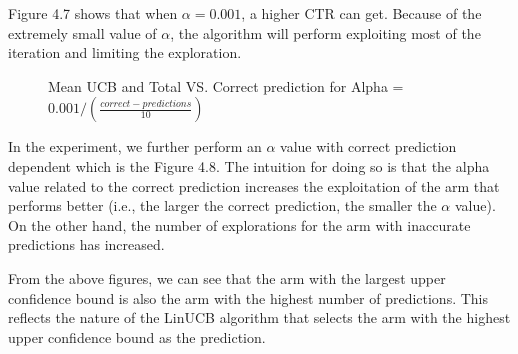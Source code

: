 Figure 4.7 shows that when $\alpha=0.001$, a higher CTR can get. Because of the extremely small value of $\alpha$, the algorithm will perform exploiting most of the iteration and limiting the exploration.
\begin{figure}[htbp]
\centering
{}%
%
\centering
\caption{ Mean UCB and Total VS. Correct prediction for
Alpha = $0.001/(\frac{correct-predictions}{10})$}
\end{figure}  
In the experiment, we further perform an $\alpha$ value with correct prediction dependent which is the Figure 4.8. The intuition for doing so is that the alpha value related to the correct prediction increases the exploitation of the arm that performs better (i.e., the larger the correct prediction, the smaller the $\alpha$ value). On the other hand, the number of explorations for the arm with inaccurate predictions has increased.

From the above figures, we can see that the arm with the largest upper confidence bound is also the arm with the highest number of predictions. This reflects the nature of the LinUCB algorithm that selects the arm with the highest upper confidence bound as the prediction.
